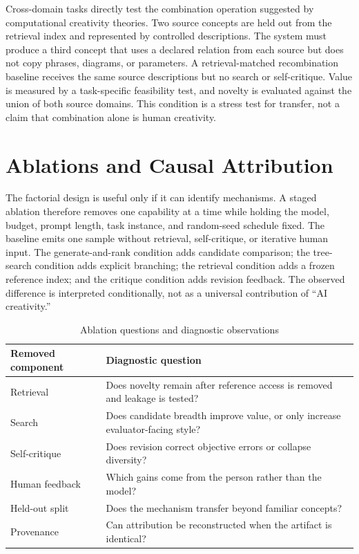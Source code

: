 \documentclass[conference]{IEEEtran}
\begin{document}
Cross-domain tasks directly test the combination operation suggested by computational
creativity theories. Two source concepts are held out from the retrieval index and
represented by controlled descriptions. The system must produce a third concept that
uses a declared relation from each source but does not copy phrases, diagrams, or
parameters. A retrieval-matched recombination baseline receives the same source
descriptions but no search or self-critique. Value is measured by a task-specific
feasibility test, and novelty is evaluated against the union of both source domains.
This condition is a stress test for transfer, not a claim that combination alone is
human creativity.

\section{Ablations and Causal Attribution}
\label{sec:ablations}

The factorial design is useful only if it can identify mechanisms. A staged ablation
therefore removes one capability at a time while holding the model, budget, prompt
length, task instance, and random-seed schedule fixed. The baseline emits one sample
without retrieval, self-critique, or iterative human input. The generate-and-rank
condition adds candidate comparison; the tree-search condition adds explicit branching;
the retrieval condition adds a frozen reference index; and the critique condition adds
revision feedback. The observed difference is interpreted conditionally, not as a
universal contribution of ``AI creativity.''

\begin{table}[t]
\caption{Ablation questions and diagnostic observations}
\label{tab:ablations}
\centering
\footnotesize
\begin{tabular}{p{}p{}}
\hline
Removed component & Diagnostic question \\
\hline
Retrieval & Does novelty remain after reference access is removed and leakage is tested? \\
Search & Does candidate breadth improve value, or only increase evaluator-facing style? \\
Self-critique & Does revision correct objective errors or collapse diversity? \\
Human feedback & Which gains come from the person rather than the model? \\
Held-out split & Does the mechanism transfer beyond familiar concepts? \\
Provenance & Can attribution be reconstructed when the artifact is identical? \\
\hline
\end{tabular}
\end{table}
\end{document}
